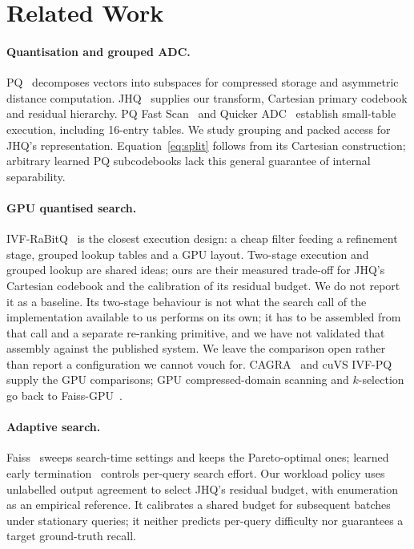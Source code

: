 \section{Related Work}
\label{sec:related}\label{sec:relatedwork}
\paragraph{Quantisation and grouped ADC.}
PQ~\cite{pq} decomposes vectors into subspaces for compressed storage and
asymmetric distance computation. JHQ~\cite{jhq} supplies our transform,
Cartesian primary codebook and residual hierarchy. PQ Fast
Scan~\cite{fastscan} and Quicker ADC~\cite{quickeradc} establish small-table
execution, including 16-entry tables. We study grouping and packed access for
JHQ's representation. Equation~\ref{eq:split} follows from its Cartesian
construction; arbitrary learned PQ subcodebooks lack this general guarantee
of internal separability.

\paragraph{GPU quantised search.}
IVF-RaBitQ~\cite{ivfrabitq} is the closest execution design: a cheap filter
feeding a refinement stage, grouped lookup tables and a GPU layout. Two-stage
execution and grouped lookup are shared ideas; ours are their measured
trade-off for JHQ's Cartesian codebook and the calibration of its residual
budget. We do not report it as a baseline. Its two-stage behaviour is not what the
search call of the implementation available to us performs on its own; it has
to be assembled from that call and a separate re-ranking primitive, and we
have not validated that assembly against the published system. We leave the
comparison open rather than report a configuration we cannot vouch for. CAGRA~\cite{cagra} and cuVS
IVF-PQ~\cite{cuvs} supply the GPU comparisons; GPU compressed-domain scanning
and $k$-selection go back to Faiss-GPU~\cite{faissgpu}.

\paragraph{Adaptive search.}
Faiss~\cite{faisslib} sweeps search-time settings and keeps the
Pareto-optimal ones; learned early termination~\cite{earlyterm} controls
per-query search effort. Our workload
policy uses unlabelled output agreement to select JHQ's residual budget, with
enumeration as an empirical reference. It calibrates a shared budget for
subsequent batches under stationary queries; it neither predicts per-query
difficulty nor guarantees a target ground-truth recall.
